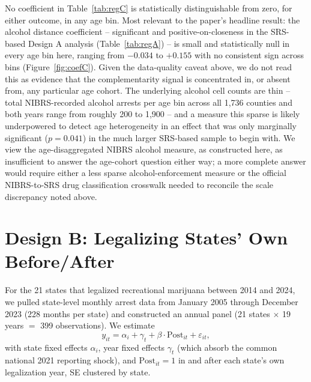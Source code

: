 \documentclass[11pt]{article}
\begin{document}
No coefficient in Table~\ref{tab:regC} is statistically distinguishable
from zero, for either outcome, in any age bin. Most relevant to the
paper's headline result: the alcohol distance coefficient -- significant
and positive-on-closeness in the SRS-based Design A analysis
(Table~\ref{tab:regA}) -- is small and statistically null in every age
bin here, ranging from $-0.034$ to $+0.155$ with no consistent sign
across bins (Figure~\ref{fig:coefC}). Given the data-quality caveat
above, we do not read this as evidence that the complementarity signal
is concentrated in, or absent from, any particular age cohort. The
underlying alcohol cell counts are thin -- total NIBRS-recorded
alcohol arrests per age bin across all 1,736 counties and both years
range from roughly 200 to 1,900 -- and a measure this sparse is likely
underpowered to detect age heterogeneity in an effect that was only
marginally significant ($p=0.041$) in the much larger SRS-based sample
to begin with. We view the age-disaggregated NIBRS alcohol measure, as
constructed here, as insufficient to answer the age-cohort question
either way; a more complete answer would require either a less sparse
alcohol-enforcement measure or the official NIBRS-to-SRS drug
classification crosswalk needed to reconcile the scale discrepancy
noted above.

\section{Design B: Legalizing States' Own Before/After}

For the 21 states that legalized recreational marijuana between 2014
and 2024, we pulled state-level monthly arrest data from January 2005
through December 2023 (228 months per state) and constructed an
annual panel (21 states $\times$ 19 years $=$ 399 observations). We
estimate
\begin{equation}
  y_{it} = \alpha_i + \gamma_t + \beta \cdot \text{Post}_{it} + \varepsilon_{it},
  \label{eq:twfe}
\end{equation}
with state fixed effects $\alpha_i$, year fixed effects $\gamma_t$
(which absorb the common national 2021 reporting shock), and
$\text{Post}_{it}=1$ in and after each state's own legalization year,
SE clustered by state.
\end{document}
